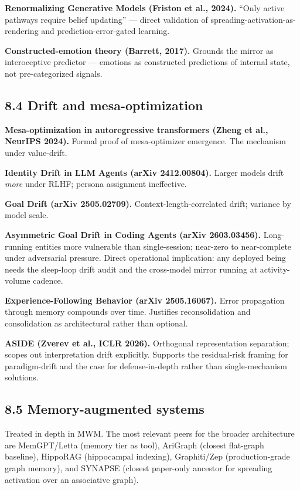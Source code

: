\documentclass[12pt]{article}
\begin{document}
\textbf{Renormalizing Generative Models (Friston et al., 2024).} ``Only active pathways require belief updating'' --- direct validation of spreading-activation-as-rendering and prediction-error-gated learning.

\textbf{Constructed-emotion theory (Barrett, 2017).} Grounds the mirror as interoceptive predictor --- emotions as constructed predictions of internal state, not pre-categorized signals.

\subsection{8.4 Drift and mesa-optimization}\label{drift-and-mesa-optimization}

\textbf{Mesa-optimization in autoregressive transformers (Zheng et al., NeurIPS 2024).} Formal proof of mesa-optimizer emergence. The mechanism under value-drift.

\textbf{Identity Drift in LLM Agents (arXiv 2412.00804).} Larger models drift \emph{more} under RLHF; persona assignment ineffective.

\textbf{Goal Drift (arXiv 2505.02709).} Context-length-correlated drift; variance by model scale.

\textbf{Asymmetric Goal Drift in Coding Agents (arXiv 2603.03456).} Long-running entities more vulnerable than single-session; near-zero to near-complete under adversarial pressure. Direct operational implication: any deployed being needs the sleep-loop drift audit and the cross-model mirror running at activity-volume cadence.

\textbf{Experience-Following Behavior (arXiv 2505.16067).} Error propagation through memory compounds over time. Justifies reconsolidation and consolidation as architectural rather than optional.

\textbf{ASIDE (Zverev et al., ICLR 2026).} Orthogonal representation separation; scopes out interpretation drift explicitly. Supports the residual-risk framing for paradigm-drift and the case for defense-in-depth rather than single-mechanism solutions.

\subsection{8.5 Memory-augmented systems}\label{memory-augmented-systems}

Treated in depth in MWM. The most relevant peers for the broader architecture are MemGPT/Letta (memory tier as tool), AriGraph (closest flat-graph baseline), HippoRAG (hippocampal indexing), Graphiti/Zep (production-grade graph memory), and SYNAPSE (closest paper-only ancestor for spreading activation over an associative graph).
\end{document}
